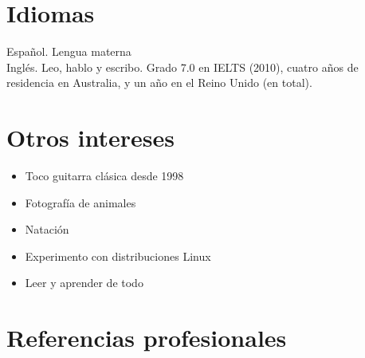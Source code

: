 \documentclass[11pt, letter]{article}
\begin{document}
\section*{Idiomas}

{\sc Espa\~nol}. Lengua materna\\
{\sc Ingl\'es}. Leo, hablo y escribo. Grado 7.0 en IELTS (2010), cuatro a\~nos de residencia en Australia, y un a\~no en el Reino Unido (en total).\\

\section*{Otros intereses}

\begin{itemize}
	\item Toco guitarra cl\'asica desde 1998
	\item Fotograf\'ia de animales
	\item Nataci\'on
	\item Experimento con distribuciones Linux
	\item Leer y aprender de todo
\end{itemize}


\section*{Referencias profesionales}
\end{document}
